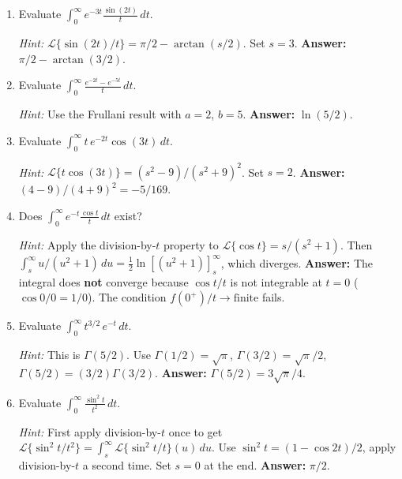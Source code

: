 \documentclass[12pt,a4paper]{article}
\begin{document}
\begin{enumerate}[label=\textbf{P\arabic*.}, leftmargin=*, itemsep=1.2em]

\item Evaluate $\displaystyle\int_0^\infty e^{-3t}\frac{\sin(2t)}{t}\, dt$.

\textit{Hint:} $\mathcal{L}\{\sin(2t)/t\} = \pi/2 - \arctan(s/2)$.
Set $s = 3$. \quad \textbf{Answer:} $\pi/2 - \arctan(3/2)$.

\item Evaluate $\displaystyle\int_0^\infty \frac{e^{-2t}-e^{-5t}}{t}\, dt$.

\textit{Hint:} Use the Frullani result with $a = 2$, $b = 5$.
\quad \textbf{Answer:} $\ln(5/2)$.

\item Evaluate $\displaystyle\int_0^\infty t\,e^{-2t}\cos(3t)\, dt$.

\textit{Hint:} $\mathcal{L}\{t\cos(3t)\} = (s^2-9)/(s^2+9)^2$. Set $s = 2$.
\quad \textbf{Answer:} $(4-9)/(4+9)^2 = -5/169$.

\item Does $\displaystyle\int_0^\infty e^{-t}\frac{\cos t}{t}\, dt$ exist?

\textit{Hint:} Apply the division-by-$t$ property to $\mathcal{L}\{\cos t\}
= s/(s^2+1)$. Then $\int_s^\infty u/(u^2+1)\,du = \frac{1}{2}\ln[(u^2+1)]_s^\infty$,
which diverges. \quad \textbf{Answer:} The integral does \textbf{not} converge
because $\cos t/t$ is not integrable at $t = 0$ ($\cos 0/0 = 1/0$). The
condition $f(0^+)/t \to \text{finite}$ fails.

\item Evaluate $\displaystyle\int_0^\infty t^{3/2}\, e^{-t}\, dt$.

\textit{Hint:} This is $\Gamma(5/2)$. Use $\Gamma(1/2) = \sqrt{\pi}$,
$\Gamma(3/2) = \sqrt{\pi}/2$, $\Gamma(5/2) = (3/2)\Gamma(3/2)$.
\quad \textbf{Answer:} $\Gamma(5/2) = 3\sqrt{\pi}/4$.

\item Evaluate $\displaystyle\int_0^\infty \frac{\sin^2 t}{t^2}\, dt$.

\textit{Hint:} First apply division-by-$t$ once to get
$\mathcal{L}\{\sin^2 t/t^2\} = \int_s^\infty \mathcal{L}\{\sin^2 t/t\}(u)\,du$.
Use $\sin^2 t = (1 - \cos 2t)/2$, apply division-by-$t$ a second time.
Set $s = 0$ at the end.
\quad \textbf{Answer:} $\pi/2$.

\end{enumerate}

\end{document}
